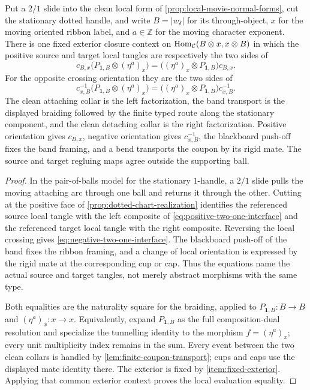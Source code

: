 \begin{lemma}
\label{lem:two-one-exact-interface}
Put a $2/1$ slide into the clean local form of
\cref{prop:local-movie-normal-forms}, cut the stationary dotted handle, and
write $B=|w_\delta|$ for its through-object, $x$ for the moving oriented
ribbon label, and $a\in\mathbb Z$ for the moving character exponent.  There
is one fixed exterior closure context on
$\operatorname{Hom}_{\mathcal{C}}(B\otimes x,x\otimes B)$ in which the positive
source and target local tangles are respectively the two sides of
\[
  c_{B,x}\bigl(P_{\mathbf1,B}\otimes(\eta^a)_x\bigr)
  =
  \bigl((\eta^a)_x\otimes P_{\mathbf1,B}\bigr)c_{B,x}.
  \tag{3.5}\label{eq:positive-two-one-interface}
\]
For the opposite crossing orientation they are the two sides of
\[
  c_{x,B}^{-1}\bigl(P_{\mathbf1,B}\otimes(\eta^a)_x\bigr)
  =
  \bigl((\eta^a)_x\otimes P_{\mathbf1,B}\bigr)c_{x,B}^{-1}.
  \tag{3.6}\label{eq:negative-two-one-interface}
\]
The clean attaching collar is the left factorization, the band transport is
the displayed braiding followed by the finite typed route along the
stationary component, and the clean detaching collar is the right
factorization.  Positive orientation gives $c_{B,x}$, negative orientation
gives $c_{x,B}^{-1}$, the blackboard push-off fixes the band framing, and a
bend transports the coupon by its rigid mate.  The source and target
regluing maps agree outside the supporting ball.
\end{lemma}

\begin{proof}
In the pair-of-balls model for the stationary $1$-handle, a $2/1$ slide
pulls the moving attaching arc through one ball and returns it through the
other.  Cutting at the positive face of
\cref{prop:dotted-chart-realization} identifies the referenced source local
tangle with the left composite of \eqref{eq:positive-two-one-interface} and
the referenced target local tangle with the right composite.  Reversing the
local crossing gives
\eqref{eq:negative-two-one-interface}.  The blackboard push-off of the band
fixes the ribbon framing, and a change of local orientation is expressed by
the rigid mate at the corresponding cup or cap.  Thus the equations name the
actual source and target tangles, not merely abstract morphisms with the same
type.

Both equalities are the naturality square for the braiding, applied to
$P_{\mathbf1,B}\colon B\to B$ and
$(\eta^a)_x\colon x\to x$.  Equivalently, expand $P_{\mathbf1,B}$ as the full
composition-dual resolution and specialize the tunnelling identity
\cite[Lemma~2.28, Equation~(2.17), p.~8]{Tham2021} to the morphism
$f=(\eta^a)_x$; every unit multiplicity index remains in the sum.  Every
event between the two clean collars is handled by
\cref{lem:finite-coupon-transport}; cups and caps use the displayed mate
identity there.  The exterior is fixed by \cref{item:fixed-exterior}.
Applying that common exterior context proves the local evaluation equality.
\end{proof}

